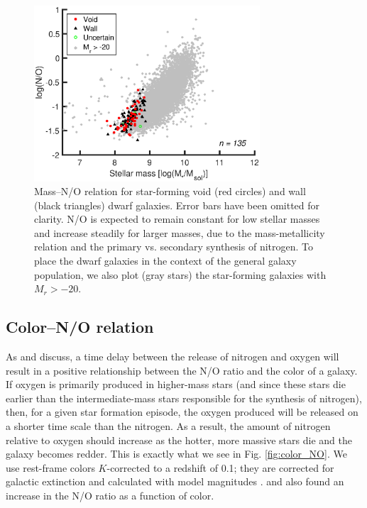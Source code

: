 \begin{figure}
    \includegraphics[width=0.75\textwidth]{Images/Paper2/MNO_1sig_I06_dwarf_0-20_SF_t3}
    \caption[Stellar mass versus N/O for 135 dwarf galaxy sample]{Mass--N/O 
    relation for star-forming void (red circles) and wall (black triangles) 
    dwarf galaxies.  Error bars have been omitted for clarity.  N/O is expected 
    to remain constant for low stellar masses and increase steadily for larger 
    masses, due to the mass-metallicity relation and the primary vs. secondary 
    synthesis of nitrogen.  To place the dwarf galaxies in the context of the 
    general galaxy population, we also plot (gray stars) the star-forming 
    galaxies with $M_r > -20$.}
    \label{fig:MNO}
\end{figure}


\subsection{Color--N/O relation}

As \cite{vanZee06a} and \cite{Berg12} discuss, a time delay between the release 
of nitrogen and oxygen will result in a positive relationship between the N/O 
ratio and the color of a galaxy.  If oxygen is primarily produced in higher-mass 
stars (and since these stars die earlier than the intermediate-mass stars 
responsible for the synthesis of nitrogen), then, for a given star formation 
episode, the oxygen produced will be released on a shorter time scale than the 
nitrogen.  As a result, the amount of nitrogen relative to oxygen should 
increase as the hotter, more massive stars die and the galaxy becomes redder.  
This is exactly what we see in Fig. \ref{fig:color_NO}.  We use rest-frame 
colors $K$-corrected to a redshift of 0.1; they are corrected for galactic 
extinction and calculated with model magnitudes \citep{Choi10}.  
\cite{vanZee06a} and \cite{Berg12} also found an increase in the N/O ratio as a 
function of color.


